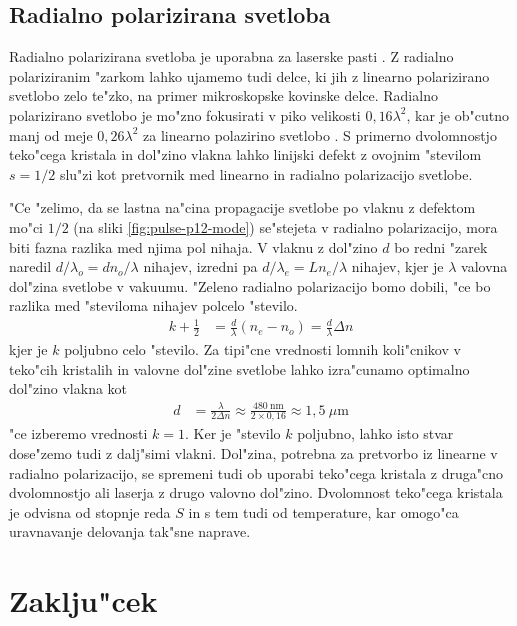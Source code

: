 \documentclass[12pt,twoside,openright,final]{report}
\begin{document}
\section{Radialno polarizirana svetloba}
Radialno polarizirana svetloba je uporabna za laserske pasti \cite{radial-trap}.
Z radialno polariziranim "zarkom lahko ujamemo tudi delce, ki jih z linearno polarizirano svetlobo zelo te"zko, na primer mikroskopske kovinske delce.
Radialno polarizirano svetlobo je mo"zno fokusirati v piko velikosti $0,\!16\lambda^2$, kar je ob"cutno manj od meje $0,\!26\lambda^2$ za linearno polazirino svetlobo \cite{radial-focus, kozawa-sato-focal-spot}. 
S primerno dvolomnostjo teko"cega kristala in dol"zino vlakna lahko linijski defekt z ovojnim "stevilom $s=1/2$ slu"zi kot pretvornik med linearno in radialno polarizacijo svetlobe. 

"Ce "zelimo, da se lastna na"cina propagacije svetlobe po vlaknu z defektom mo"ci $1/2$ (na sliki \ref{fig:pulse-p12-mode}) se"stejeta v radialno polarizacijo, mora biti fazna razlika med njima pol nihaja. 
V vlaknu z dol"zino $d$ bo redni "zarek naredil $d/\lambda_o = d n_o/\lambda$ nihajev, izredni pa $d/\lambda_e = Ln_e/\lambda$ nihajev, kjer je $\lambda$ valovna dol"zina svetlobe v vakuumu. 
"Zeleno radialno polarizacijo bomo dobili, "ce bo razlika med "steviloma nihajev polcelo "stevilo. 
\begin{align}
  k + \frac{1}{2} &= \frac{d}{\lambda} \left( n_e - n_o \right) = \frac{d}{\lambda} \Delta n
\end{align}
kjer je $k$ poljubno celo "stevilo. Za tipi"cne vrednosti lomnih koli"cnikov v teko"cih kristalih in valovne dol"zine svetlobe lahko izra"cunamo optimalno dol"zino vlakna kot
\begin{align}
 d &= \frac{\lambda}{2\Delta n} \approx \frac{480~\mathrm{nm}}{2 \times 0,\!16} \approx 1,\!5~\mu\mathrm{m}
\end{align}
"ce izberemo vrednosti $k=1$. Ker je "stevilo $k$ poljubno, lahko isto stvar dose"zemo tudi z dalj"simi vlakni. 
Dol"zina, potrebna za pretvorbo iz linearne v radialno polarizacijo, se spremeni tudi ob uporabi teko"cega kristala z druga"cno dvolomnostjo ali laserja z drugo valovno dol"zino. 
Dvolomnost teko"cega kristala je odvisna od stopnje reda $S$ in s tem tudi od temperature, kar omogo"ca uravnavanje delovanja tak"sne naprave. 

\chapter{Zaklju"cek}
\end{document}
